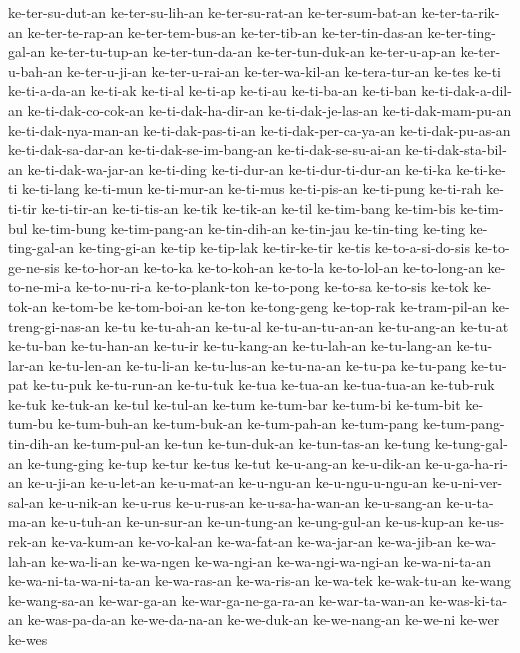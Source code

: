 {ke-ter-su-dut-an ke-ter-su-lih-an ke-ter-su-rat-an ke-ter-sum-bat-an
ke-ter-ta-rik-an ke-ter-te-rap-an ke-ter-tem-bus-an ke-ter-tib-an
ke-ter-tin-das-an ke-ter-ting-gal-an ke-ter-tu-tup-an ke-ter-tun-da-an
ke-ter-tun-duk-an ke-ter-u-ap-an ke-ter-u-bah-an ke-ter-u-ji-an
ke-ter-u-rai-an ke-ter-wa-kil-an ke-tera-tur-an ke-tes ke-ti ke-ti-a-da-an
ke-ti-ak ke-ti-al ke-ti-ap ke-ti-au ke-ti-ba-an ke-ti-ban
ke-ti-dak-a-dil-an ke-ti-dak-co-cok-an ke-ti-dak-ha-dir-an
ke-ti-dak-je-las-an ke-ti-dak-mam-pu-an ke-ti-dak-nya-man-an
ke-ti-dak-pas-ti-an ke-ti-dak-per-ca-ya-an ke-ti-dak-pu-as-an
ke-ti-dak-sa-dar-an ke-ti-dak-se-im-bang-an ke-ti-dak-se-su-ai-an
ke-ti-dak-sta-bil-an ke-ti-dak-wa-jar-an ke-ti-ding ke-ti-dur-an
ke-ti-dur-ti-dur-an ke-ti-ka ke-ti-ke-ti ke-ti-lang ke-ti-mun ke-ti-mur-an
ke-ti-mus ke-ti-pis-an ke-ti-pung ke-ti-rah ke-ti-tir ke-ti-tir-an
ke-ti-tis-an ke-tik ke-tik-an ke-til ke-tim-bang ke-tim-bis ke-tim-bul
ke-tim-bung ke-tim-pang-an ke-tin-dih-an ke-tin-jau ke-tin-ting ke-ting
ke-ting-gal-an ke-ting-gi-an ke-tip ke-tip-lak ke-tir-ke-tir ke-tis
ke-to-a-si-do-sis ke-to-ge-ne-sis ke-to-hor-an ke-to-ka ke-to-koh-an
ke-to-la ke-to-lol-an ke-to-long-an ke-to-ne-mi-a ke-to-nu-ri-a
ke-to-plank-ton ke-to-pong ke-to-sa ke-to-sis ke-tok ke-tok-an ke-tom-be
ke-tom-boi-an ke-ton ke-tong-geng ke-top-rak ke-tram-pil-an
ke-treng-gi-nas-an ke-tu ke-tu-ah-an ke-tu-al ke-tu-an-tu-an-an
ke-tu-ang-an ke-tu-at ke-tu-ban ke-tu-han-an ke-tu-ir ke-tu-kang-an
ke-tu-lah-an ke-tu-lang-an ke-tu-lar-an ke-tu-len-an ke-tu-li-an
ke-tu-lus-an ke-tu-na-an ke-tu-pa ke-tu-pang ke-tu-pat ke-tu-puk
ke-tu-run-an ke-tu-tuk ke-tua ke-tua-an ke-tua-tua-an ke-tub-ruk ke-tuk
ke-tuk-an ke-tul ke-tul-an ke-tum ke-tum-bar ke-tum-bi ke-tum-bit
ke-tum-bu ke-tum-buh-an ke-tum-buk-an ke-tum-pah-an ke-tum-pang
ke-tum-pang-tin-dih-an ke-tum-pul-an ke-tun ke-tun-duk-an ke-tun-tas-an
ke-tung ke-tung-gal-an ke-tung-ging ke-tup ke-tur ke-tus ke-tut
ke-u-ang-an ke-u-dik-an ke-u-ga-ha-ri-an ke-u-ji-an ke-u-let-an
ke-u-mat-an ke-u-ngu-an ke-u-ngu-u-ngu-an ke-u-ni-ver-sal-an ke-u-nik-an
ke-u-rus ke-u-rus-an ke-u-sa-ha-wan-an ke-u-sang-an ke-u-ta-ma-an
ke-u-tuh-an ke-un-sur-an ke-un-tung-an ke-ung-gul-an ke-us-kup-an
ke-us-rek-an ke-va-kum-an ke-vo-kal-an ke-wa-fat-an ke-wa-jar-an
ke-wa-jib-an ke-wa-lah-an ke-wa-li-an ke-wa-ngen ke-wa-ngi-an
ke-wa-ngi-wa-ngi-an ke-wa-ni-ta-an ke-wa-ni-ta-wa-ni-ta-an ke-wa-ras-an
ke-wa-ris-an ke-wa-tek ke-wak-tu-an ke-wang ke-wang-sa-an ke-war-ga-an
ke-war-ga-ne-ga-ra-an ke-war-ta-wan-an ke-was-ki-ta-an ke-was-pa-da-an
ke-we-da-na-an ke-we-duk-an ke-we-nang-an ke-we-ni ke-wer ke-wes
}
